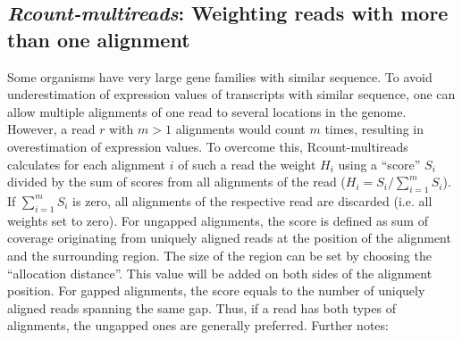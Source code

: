 \documentclass[a4paper,10pt]{article}
\begin{document}
\subsection{\textit{Rcount-multireads}: Weighting reads with more than one alignment}
Some organisms have very large gene families with similar sequence. To avoid underestimation of expression values of transcripts with similar sequence, one can allow multiple alignments of one read to several locations in the genome. However, a read $r$ with $m > 1$ alignments would count $m$ times, resulting in overestimation of expression values. To overcome this, Rcount-multireads calculates for each alignment $i$ of such a read the weight $H_{i}$ using a ``score'' $S_{i}$ divided by the sum of scores from all alignments of the read ($H_{i} = S_{i} / \sum_{i = 1}^{m} S_{i}$). If $\sum_{i = 1}^{m} S_{i}$ is zero, all alignments of the respective read are discarded (i.e. all weights set to zero). For ungapped alignments, the score is defined as sum of coverage originating from uniquely aligned reads at the position of the alignment and the surrounding region. The size of the region can be set by choosing the ``allocation distance''. This value will be added on both sides of the alignment position. For gapped alignments, the score equals to the number of uniquely aligned reads spanning the same gap. Thus, if a read has both types of alignments, the ungapped ones are generally preferred.
\newline
\newline
Further notes:
\end{document}
